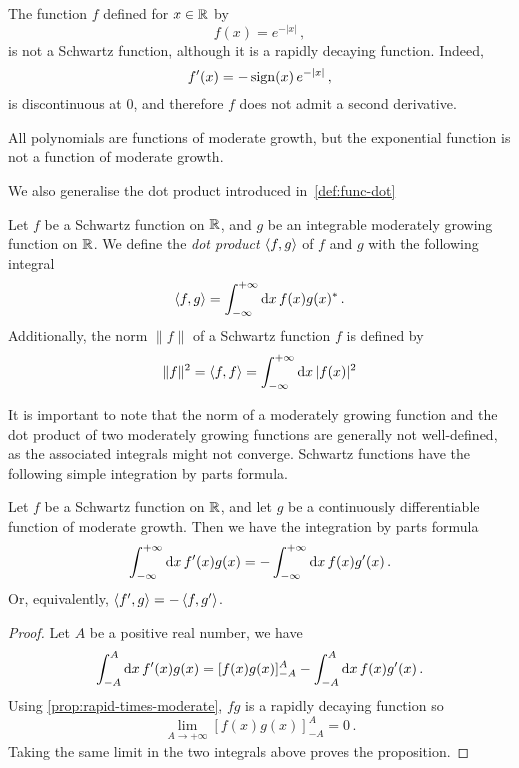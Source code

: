 \begin{example}
  The function $f$ defined for $x\in\mathbb{R}$ by
  \begin{equation}
    f(x)=e^{-|x|}\,,
  \end{equation}
  is not a Schwartz function, although it is a rapidly decaying function. Indeed,
  \begin{equation}
    f'(x)=-\operatorname{sign}(x)\,e^{-|x|}\,,
  \end{equation}
  is discontinuous at $0$, and therefore $f$ does not admit a second derivative.
\end{example}
\begin{example}
  All polynomials are functions of moderate growth, but the exponential function is not a
  function of moderate growth.
\end{example}
We also generalise the dot product introduced in~\cref{def:func-dot}
\begin{definition}
  Let $f$ be a Schwartz function on $\mathbb{R}$, and $g$ be an integrable moderately growing
  function on $\mathbb{R}$. We define the \emph{dot product} $\braket{f,g}$ of $f$ and $g$ with
  the following integral
  \begin{equation}
    \braket{f,g}=\int_{-\infty}^{+\infty}\mathrm{d}{x}\,f(x)g(x)^*\,.
  \end{equation}
  Additionally, the norm $\|f\|$ of a Schwartz function $f$ is defined by
  \begin{equation}
    \|f\|^2=\braket{f,f}=\int_{-\infty}^{+\infty}\mathrm{d}{x}\,|f(x)|^2
  \end{equation}
\end{definition}
It is important to note that the norm of a moderately growing function and the dot product
of two moderately growing functions are generally not well-defined, as the associated
integrals might not converge. Schwartz functions have the following simple integration by
parts formula.
\begin{proposition}
  \label{prop:schwartz-partint}
  Let $f$ be a Schwartz function on $\mathbb{R}$, and let $g$ be a continuously differentiable
  function of moderate growth. Then we have the integration by parts formula
  \begin{equation}
    \int_{-\infty}^{+\infty}\mathrm{d}{x}\,f'(x)g(x)=-\int_{-\infty}^{+\infty}\mathrm{d}{x}\,f(x)g'(x)\,.
  \end{equation}
  Or, equivalently, $\braket{f',g}=-\braket{f,g'}$.
\end{proposition}
\begin{proof}
  Let $A$ be a positive real number, we have
  \begin{equation}
    \int_{-A}^A\mathrm{d} x\,f'(x)g(x)=[f(x)g(x)]_{-A}^A-\int_{-A}^A\mathrm{d} x\,f(x)g'(x)\,.
  \end{equation}
  Using \cref{prop:rapid-times-moderate}, $fg$ is a rapidly decaying function so
  \begin{equation}
    \lim_{A\to+\infty}[f(x)g(x)]_{-A}^A=0\,.
  \end{equation}
  Taking the same limit in the two integrals above proves the proposition.
\end{proof}
